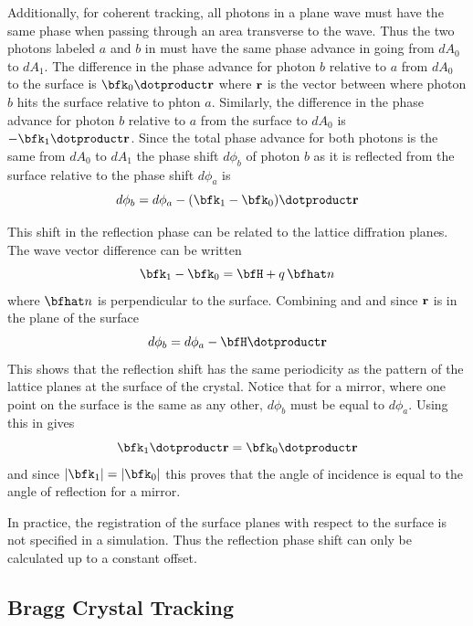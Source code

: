 Additionally, for coherent tracking, all photons in a plane wave must
have the same phase when passing through an area transverse to the
wave. Thus the two photons labeled $a$ and $b$ in
 must have the same phase advance in going from
$dA_0$ to $dA_1$. The difference in the phase advance for photon $b$
relative to $a$ from $dA_0$ to the surface is $\bfk_0 \dotproduct \bfr$
where ${\bf r}$ is the vector between where photon $b$ hits the surface
relative to phton $a$. Similarly, the difference in the phase advance
for photon $b$ relative to $a$ from the surface to $dA_0$ is $-\bfk_1
\dotproduct \bfr$. Since the total phase advance for both photons is the
same from $dA_0$ to $dA_1$ the phase shift $d\phi_b$ of photon $b$ as
it is reflected from the surface relative to the phase shift $d\phi_a$
is
\begin{equation}
  d\phi_b = d\phi_a - (\bfk_1 - \bfk_0) \dotproduct \bfr
  \label{dpbdpa}
\end{equation}

This shift in the reflection phase can be related to the lattice
diffration planes. The wave vector difference can be written
\begin{equation}
  \bfk_1 - \bfk_0 = \bfH + q \, \bfhat n
  \label{k1k0}
\end{equation}
where $\bfhat n$ is perpendicular to the surface. Combining
 and  and since ${\bf r}$ is in
the plane of the surface
\begin{equation}
  d\phi_b = d\phi_a - \bfH \dotproduct \bfr
\end{equation}
This shows that the reflection shift has the same periodicity as the
pattern of the lattice planes at the surface of the crystal. Notice
that for a mirror, where one point on the surface is the same as any
other, $d\phi_b$ must be equal to $d\phi_a$. Using this in 
gives 
\begin{equation}
  \bfk_1 \dotproduct \bfr = \bfk_0 \dotproduct \bfr
\end{equation}
and since $|\bfk_1| = |\bfk_0|$ this proves that the angle of
incidence is equal to the angle of reflection for a mirror.

In practice, the registration of the surface planes with respect to
the surface is not specified in a simulation. Thus the reflection
phase shift can only be calculated up to a constant offset. 

\subsection{Bragg Crystal Tracking}
\label{s:bragg.track}

